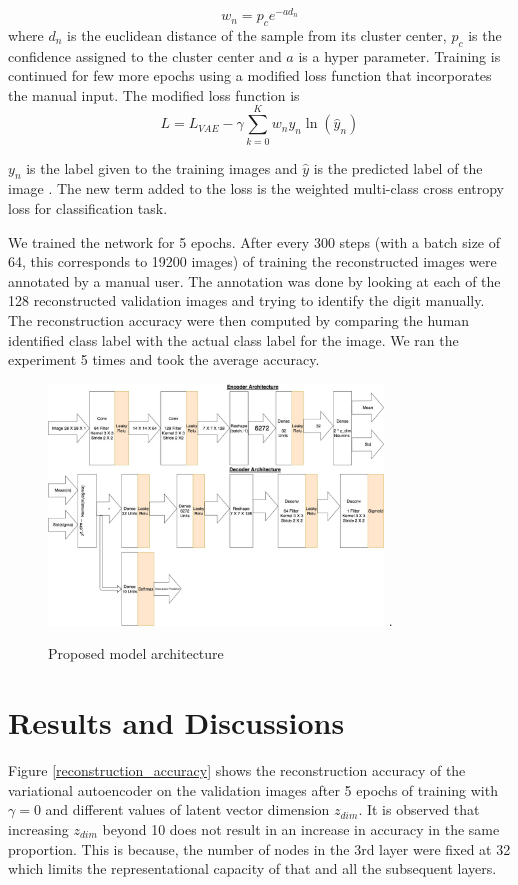 \documentclass[journal]{IEEEtran}
\begin{document}
\begin{equation}
w_n = p_ce^{-a d_n}
\end{equation}
where $d_n$ is the euclidean distance of the sample from its cluster center, $p_c$  is the confidence assigned to the cluster center and $a$ is a hyper parameter.
Training is continued for few more epochs using a modified loss function that incorporates the manual input. The modified loss function is
\begin{equation}
L = L_{VAE}  - \gamma \sum_{k=0}^{K}w_{n}y_{n}\ln(\hat{y}_{n})
\end{equation}

$y_n$ is the label given to the training images and $\hat{y}$ is the predicted label of the image . The new term added to the loss is the weighted multi-class cross entropy loss for classification task. 

We trained the network for 5 epochs. After every 300 steps (with a batch size of 64, this corresponds to 19200 images) of training the reconstructed images were annotated by a manual user. The annotation was done by looking at each of the 128  reconstructed validation images and trying to identify the digit manually. The reconstruction accuracy were then computed by comparing the human identified class label with the actual class label for the image. We ran the experiment 5 times and took the average accuracy.


\begin{figure}[!t]
\centering
\includegraphics[width=3.5in]{vae_model_architecture_classification.jpg}
\DeclareGraphicsExtensions.
\caption{Proposed model architecture}
\label{vae_architecture}
\end{figure}


\section{Results and Discussions} \label{results}
Figure \ref{reconstruction_accuracy} shows  the reconstruction accuracy of the variational autoencoder on the validation images after 5 epochs of training with $\gamma = 0$  and different values of latent vector dimension $z_{dim}$. It is observed that increasing $z_{dim}$ beyond 10 does not result in an increase in accuracy in the same proportion. This is because, the number of nodes in the 3rd layer were fixed at 32 which limits the representational capacity of that and all the subsequent layers.
\end{document}
